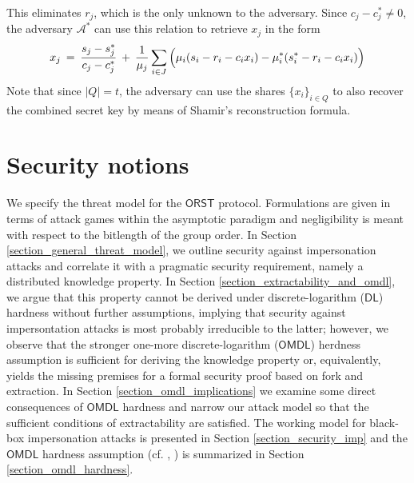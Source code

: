 \documentclass{iacrtrans}
\begin{document}
This eliminates $r_j$,
which is the only unknown to the adversary.
Since $c_j - c_j^* \neq 0$, the adversary
$\mathcal{A}^*$ can use this relation to retrieve
$x_j$ in the form
\vspace{5pt}
\begin{equation}\label{orst_key_recovery}
x_j
\hspace{2pt}
=
\hspace{2pt}
\frac{s_j - s_j^*}{c_j - c_j^*}
\hspace{2pt}
+
\hspace{2pt}
\frac{1}{\mu_j} \sum_{i \in J}
\hspace{0pt}
\Big(
	\mu_i (s_i - r_i - c_i x_i) -
	\mu_i^* (s_i^* - r_i - c_i x_i)
\Big)\hspace{1pt}
\vspace{5pt}
\end{equation}
\noindent
Note that since $|Q| = t$, the adversary can use
the shares $\{x_i\}_{i \in Q}$
to also recover the combined secret key
by means of Shamir's reconstruction formula.

\section{Security notions}\label{section_security_notions}

\noindent
We specify the threat model for the
$\mathsf{ORST}$ protocol.
Formulations are given in terms of attack games within the
asymptotic paradigm and negligibility
is meant with respect to the bitlength
of the group order.
In Section \ref{section_general_threat_model}, we outline
security against impersonation attacks
and correlate it with a pragmatic security requirement,
namely a distributed knowledge property.
In Section \ref{section_extractability_and_omdl},
we argue that this property cannot be derived
under discrete-logarithm ($\mathsf{DL}$) hardness
without further assumptions,
implying that security against impersontation
attacks is most probably irreducible
to the latter; however, we observe that the stronger
one-more discrete-logarithm ($\mathsf{OMDL}$) herdness assumption
is sufficient for deriving the knowledge property or,
equivalently, yields the missing premises
for a formal security proof based on fork and extraction.
In Section \ref{section_omdl_implications}
we examine some direct consequences of $\mathsf{OMDL}$ hardness
and narrow our attack model
so that the sufficient conditions of extractability are satisfied.
The working model for black-box impersonation attacks is presented
in Section \ref{section_security_imp}
and the $\mathsf{OMDL}$ hardness assumption
(cf. \cite{paper_bellare_palacio}, \cite{paper_bellare_omdl})
is summarized in Section
\ref{section_omdl_hardness}.
\end{document}
